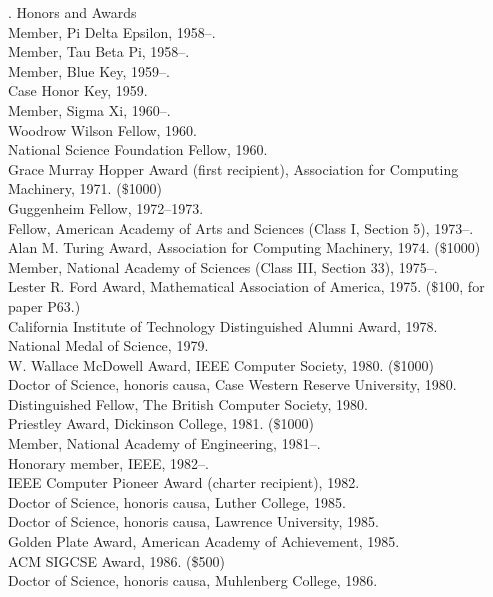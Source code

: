 . {Honors and Awards}
\\Member, Pi Delta Epsilon, 1958--.
\\Member, Tau Beta Pi, 1958--.
\\Member, Blue Key, 1959--.
\\Case Honor Key, 1959.
\\Member, Sigma Xi, 1960--.
\\Woodrow Wilson Fellow, 1960.
\\National Science Foundation Fellow, 1960.
\\Grace Murray Hopper Award (first recipient), Association for
 Computing Ma\-chin\-ery, 1971. ($\$$1000)
\\Guggenheim Fellow, 1972--1973.
\\Fellow, American Academy of Arts and Sciences (Class I, Section 5), 1973--.
\\Alan M. Turing Award, Association for Computing Machinery, 1974.  ($\$$1000)
\\Member, National Academy of Sciences (Class III, Section 33), 1975--.
\\Lester R. Ford Award, Mathematical Association of America, 1975.  ($\$$100, 
 for paper P63.)
\\California Institute of Technology Distinguished Alumni Award, 1978.
\\National Medal of Science, 1979.
\\W. Wallace McDowell Award, IEEE Computer Society, 1980.  ($\$$1000)
\\Doctor of Science, honoris causa, Case Western Reserve University, 1980. %
\\Distinguished Fellow, The British Computer Society, 1980.
\\Priestley Award, Dickinson College, 1981. ($\$$1000)
\\Member, National Academy of Engineering, 1981--.
\\Honorary member, IEEE, 1982--.
\\IEEE Computer Pioneer Award (charter recipient), 1982.
\\Doctor of Science, honoris causa, Luther College, 1985. %
\\Doctor of Science, honoris causa, Lawrence University, 1985. %
\\Golden Plate Award, American Academy of Achievement, 1985.
\\ACM SIGCSE Award, 1986. (\$500)
\\Doctor of Science, honoris causa, Muhlenberg College, 1986. %

